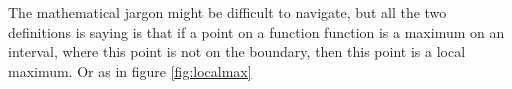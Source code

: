 The mathematical jargon might be difficult to navigate, but all the two definitions is saying is that if a point on a function function is a maximum on an interval, where this point is not on the boundary, then this point is a local maximum. Or as in figure \eqref{fig:localmax}
\begin{figure}[h]
	\centering
	\caption{}
	\label{fig:localmax}
\end{figure}









